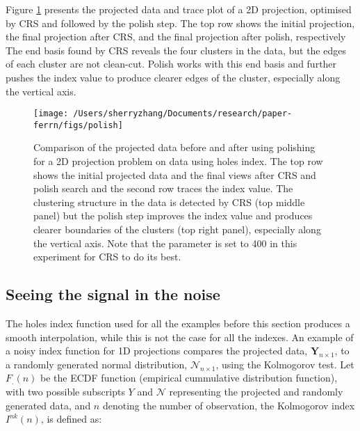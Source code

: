 Figure \ref{fig:polish} presents the projected data and trace plot of a
2D projection, optimised by CRS and followed by the polish step. The top
row shows the initial projection, the final projection after CRS, and
the final projection after polish, respectively The end basis found by
CRS reveals the four clusters in the data, but the edges of each cluster
are not clean-cut. Polish works with this end basis and further pushes
the index value to produce clearer edges of the cluster, especially
along the vertical axis.

\begin{Schunk}
\begin{figure}

{\centering \texttt{[image: /Users/sherryzhang/Documents/research/paper-ferrn/figs/polish]} 

}

\caption{Comparison of the projected data before and after using polishing for a 2D projection problem on  data using holes index. The top row shows the initial projected data and the final views after CRS and polish search and the second row traces the index value. The clustering structure in the data is detected by CRS (top middle panel) but the polish step improves the index value and produces clearer boundaries of the clusters (top right panel), especially along the vertical axis. Note that the parameter  is set to 400 in this experiment for CRS to do its best. }\label{fig:polish}
\end{figure}
\end{Schunk}

\hypertarget{seeing-the-signal-in-the-noise}{%
\subsection{Seeing the signal in the
noise}\label{seeing-the-signal-in-the-noise}}

The holes index function used for all the examples before this section
produces a smooth interpolation, while this is not the case for all the
indexes. An example of a noisy index function for 1D projections
compares the projected data, \(\mathbf{Y}_{n \times 1}\), to a randomly
generated normal distribution, \(\mathcal{N}_{n \times 1}\), using the
Kolmogorov test. Let \(F_{.}(n)\) be the ECDF function (empirical
cummulative distribution function), with two possible subscripts \(Y\)
and \(\mathcal{N}\) representing the projected and randomly generated
data, and \(n\) denoting the number of observation, the Kolmogorov index
\(I^{nk}(n)\), is defined as:

